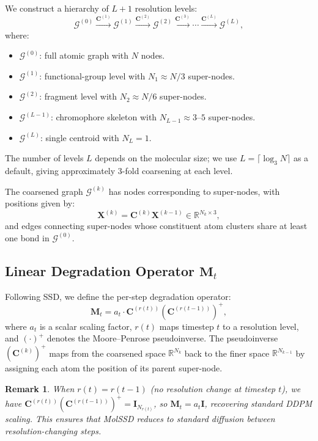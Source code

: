 \documentclass[12pt,a4paper]{article}
\newtheorem{remark}[theorem]{Remark}
\providecommand{\R}{}
\renewcommand{\R}{\mathbb{R}}
\newcommand{\cG}{\mathcal{G}}
\newcommand{\Mt}{\bm{M}_t}
\begin{document}
We construct a hierarchy of $L+1$ resolution levels:
\begin{equation}\label{eq:hierarchy}
    \cG^{(0)} \xrightarrow{\bm{C}^{(1)}} \cG^{(1)} \xrightarrow{\bm{C}^{(2)}} \cG^{(2)} \xrightarrow{\bm{C}^{(3)}} \cdots \xrightarrow{\bm{C}^{(L)}} \cG^{(L)},
\end{equation}
where:
\begin{itemize}
    \item $\cG^{(0)}$: full atomic graph with $N$ nodes.
    \item $\cG^{(1)}$: functional-group level with $N_1 \approx N/3$ super-nodes.
    \item $\cG^{(2)}$: fragment level with $N_2 \approx N/6$ super-nodes.
    \item $\cG^{(L-1)}$: chromophore skeleton with $N_{L-1} \approx 3$--$5$ super-nodes.
    \item $\cG^{(L)}$: single centroid with $N_L = 1$.
\end{itemize}
The number of levels $L$ depends on the molecular size; we use $L = \lceil \log_3 N \rceil$ as a default, giving approximately 3-fold coarsening at each level.

The coarsened graph $\cG^{(k)}$ has nodes corresponding to super-nodes, with positions given by:
\begin{equation}\label{eq:coarse_positions}
    \bm{X}^{(k)} = \bm{C}^{(k)} \bm{X}^{(k-1)} \in \R^{N_k \times 3},
\end{equation}
and edges connecting super-nodes whose constituent atom clusters share at least one bond in $\cG^{(0)}$.

\subsection{Linear Degradation Operator \texorpdfstring{$\Mt$}{M\_t}}\label{sec:degradation}

Following SSD, we define the per-step degradation operator:
\begin{equation}\label{eq:mol_Mt}
    \Mt = a_t \cdot \bm{C}^{(r(t))} \left(\bm{C}^{(r(t-1))}\right)^+,
\end{equation}
where $a_t$ is a scalar scaling factor, $r(t)$ maps timestep $t$ to a resolution level, and $(\cdot)^+$ denotes the Moore--Penrose pseudoinverse. The pseudoinverse $(\bm{C}^{(k)})^+$ maps from the coarsened space $\R^{N_k}$ back to the finer space $\R^{N_{k-1}}$ by assigning each atom the position of its parent super-node.

\begin{remark}
When $r(t) = r(t-1)$ (no resolution change at timestep $t$), we have $\bm{C}^{(r(t))} (\bm{C}^{(r(t-1))})^+ = \bm{I}_{N_{r(t)}}$, so $\Mt = a_t \bm{I}$, recovering standard DDPM scaling. This ensures that MolSSD reduces to standard diffusion between resolution-changing steps.
\end{remark}
\end{document}

